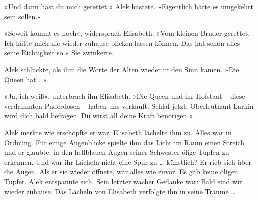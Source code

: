 »Und dann hast du mich gerettet.« Alek hustete. »Eigentlich hätte
es umgekehrt sein sollen.«

»Soweit kommt es noch«, widersprach Elisabeth. »Vom kleinen Bruder
gerettet. Ich hätte mich nie wieder zuhause blicken lassen können.
Das hat schon alles seine Richtigkeit so.« Sie zwinkerte.

Alek schluckte, als ihm die Worte der Alten wieder in den Sinn
kamen. »Die Queen hat \ldots{}«

»Ja, ich weiß«, unterbrach ihn Elisabeth. »Die Queen und ihr
Hofstaat – diese verdammten Puderdosen – haben uns verkauft. Schlaf
jetzt. Oberleutnant Larkin wird dich bald befragen. Du wirst all
deine Kraft benötigen.«

Alek merkte wie erschöpfte er war. Elisabeth lächelte ihm zu. Alles
war in Ordnung. Für einige Augenblicke spielte ihm das Licht im
Raum einen Streich und er glaubte, in den hellblauen Augen seiner
Schwester ölige Tupfen zu erkennen. Und war ihr Lächeln nicht eine
Spur zu … künstlich? Er rieb sich über die Augen. Als er sie wieder
öffnete, war alles wie zuvor. Es gab keine öligen Tupfer. Alek
entspannte sich. Sein letzter wacher Gedanke war: Bald sind wir
wieder zuhause. Das Lächeln von Elisabeth verfolgte ihn in seine
Träume …


